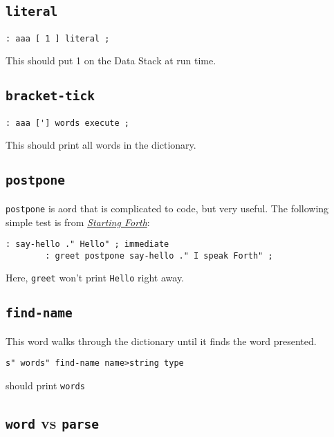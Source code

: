\subsection{\texttt{literal}}

\begin{lstlisting}[frame=lines]
        : aaa [ 1 ] literal ;
\end{lstlisting}

\noindent This should put 1 on the Data Stack at run time.


\subsection{\texttt{bracket-tick}}

\begin{lstlisting}[frame=lines]
        : aaa ['] words execute ;
\end{lstlisting}

\noindent This should print all words in the dictionary.


\subsection{\texttt{postpone}}

\texttt{postpone} is aord that is complicated to code, but very useful. The
following simple test is from
\href{https://www.forth.com/starting-forth/11-forth-compiler-defining-words/}{\textit{Starting
Forth}}:

\begin{lstlisting}[frame=lines]
        : say-hello ." Hello" ; immediate
        : greet postpone say-hello ." I speak Forth" ;
\end{lstlisting}

\noindent Here, \texttt{greet} won't print \texttt{Hello} right away.


\subsection{\texttt{find-name}}

This word walks through the dictionary until it finds the word presented. 

\begin{lstlisting}[frame=lines]
        s" words" find-name name>string type
\end{lstlisting}

\noindent should print \texttt{words}


\subsection{\texttt{word} vs \texttt{parse}}

